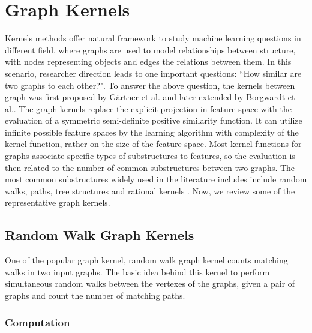 \chapter{Graph Kernels} %

\label{Chapter4} %


Kernels methods offer natural framework to study machine learning questions in different field, where graphs are used to model relationships between structure, with nodes representing objects and edges the relations between them. In this scenario, researcher direction leads to one important questions: “How similar are two graphs to each other?". To answer the above question, the kernels between graph was first proposed by G{\"a}rtner et al. \citep{Gartner2003} and later extended by Borgwardt et al.\citep{Borgwardt2005}. The graph kernels replace the explicit projection in feature space with the evaluation of a symmetric semi-definite positive similarity function. It can utilize infinite possible feature spaces by the learning algorithm with complexity of the kernel function, rather on the size of the feature space. Most kernel functions for graphs associate specific types of substructures to features, so the evaluation is then related to the number of common substructures between two graphs. The most common substructures widely used in the literature includes include random walks, paths, tree structures and rational kernels \citep{Vishwanathan2010}. Now, we review some of the representative graph kernels. 

\section{Random Walk Graph Kernels}
\label{sec:RWGK}

One of the popular graph kernel, random walk graph kernel \citep{Gartner2003, Kashima2003} counts matching walks in two input graphs. The basic idea behind this kernel to perform simultaneous random
walks between the vertexes of the graphs,  given a pair of graphs and count the number of matching paths.

\subsection{Computation}

